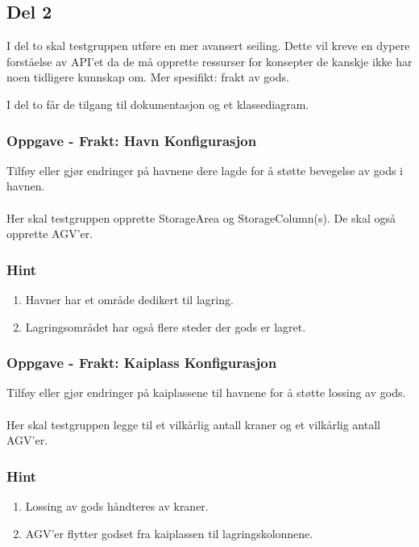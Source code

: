 \documentclass[12pt]{article}
\begin{document}
\newpage
\subsection{Del 2}

I del to skal testgruppen utføre en mer avansert seiling. Dette vil kreve en dypere forståelse av API'et da de må opprette ressurser
for konsepter de kanskje ikke har noen tidligere kunnskap om. Mer spesifikt: frakt av gods.

I del to får de tilgang til dokumentasjon og et klassediagram.

\subsubsection{Oppgave - Frakt: Havn Konfigurasjon}

Tilføy eller gjør endringer på havnene dere lagde for å støtte bevegelse av gods i havnen. \\ \\
Her skal testgruppen opprette StorageArea og StorageColumn(s). De skal også opprette AGV'er.

\subsubsection*{Hint}

\begin{enumerate}
    \item Havner har et område dedikert til lagring.
    \item Lagringsområdet har også flere steder der gods er lagret.
\end{enumerate}

\subsubsection{Oppgave - Frakt: Kaiplass Konfigurasjon}

Tilføy eller gjør endringer på kaiplassene til havnene for å støtte lossing av gods. \\ \\
Her skal testgruppen legge til et vilkårlig antall kraner og et vilkårlig antall AGV'er.

\subsubsection*{Hint}

\begin{enumerate}
    \item Lossing av gods håndteres av kraner.
    \item AGV'er flytter godset fra kaiplassen til lagringskolonnene.
\end{enumerate}
\end{document}
